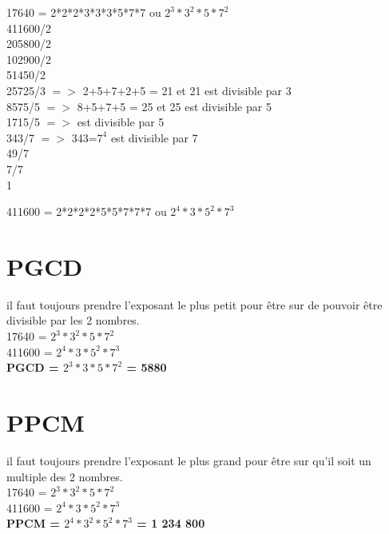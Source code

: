 17640 = 2*2*2*3*3*3*5*7*7 ou $2^{3}*3^{2}*5*7^{2}$ \\


411600/2 \\
205800/2 \\
102900/2 \\
51450/2 \\
25725/3 $=>$ 2+5+7+2+5 = 21 et 21 est divisible par 3 \\
8575/5 $=>$ 8+5+7+5 = 25 et 25 est divisible par 5 \\
1715/5 $=>$ est divisible par 5 \\
343/7 $=>$ 343=$7^{4}$ est divisible par 7 \\
49/7 \\
7/7 \\
1

411600 = 2*2*2*2*5*5*7*7*7 ou $2^{4}*3*5^{2}*7^{3}$ \\

\section{PGCD}

il faut toujours prendre l'exposant le plus petit pour être sur de pouvoir être divisible par les 2 nombres. \\

17640 = $2^{3}*3^{2}*5*7^{2}$ \\
411600 = $2^{4}*3*5^{2}*7^{3}$ \\

\textbf{PGCD = $2^{3}*3*5*7^{2}$ = 5880} \\

\section{PPCM}

il faut toujours prendre l'exposant le plus grand pour être sur qu'il soit un multiple des 2 nombres. \\

17640 = $2^{3}*3^{2}*5*7^{2}$ \\
411600 = $2^{4}*3*5^{2}*7^{3}$ \\

\textbf{PPCM = $2^{4}*3^{2}*5^{2}*7^{3}$ = 1 234 800 } \\
